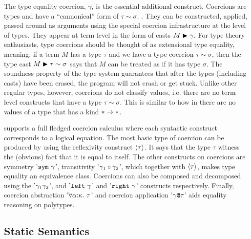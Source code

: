 \documentclass[manuscript,screen,nonacm]{acmart}
\begin{document}
The type equality coercion, $\gamma$, is the essential additional construct. Coercions are types and have a ``cannonical'' form of $\tau\sim\sigma$. . They can be constructed, applied, passed around as arguments using the special coercion infrastructure at the level of types. They appear at term level in the form of casts $M\mathrel{\blacktriangleright}\gamma$. For type theory enthusiasts, type coercions should be thought of as extensional type equality, meaning, if a term $M$ has a type $\tau$ and we have a type coercion $\tau\sim\sigma$, then the type cast $M\mathrel{\blacktriangleright}\tau\sim\sigma$ says that $M$ can be treated as if it has type $\sigma$. The soundness property of the type system guarantees that after the types (including casts) have been erased, the program will not crash or get stuck. Unlike other regular types, however, coercions do not classify values, i.e. there are no term level constructs that have a type $\tau\sim\sigma$. This is similar to how in \SFw there are no values of a type that has a kind $\ast\to\ast$.

\SFC supports a full fledged coercion calculus where each syntactic construct corresponds to a logical equation. The most basic type of coercion can be produced by using the reflexivity construct $\langle\tau\rangle$. It says that the type $\tau$ witness the (obvious) fact that it is equal to itself. The other constructs on coercions are symmetry '$\texttt{sym}~{\gamma}$', transitivity '$\gamma_1 \circ \gamma_2$', which together with $\langle\tau\rangle$, makes type equality an equivalence class. Coercions can also be composed and decomposed using the '$\gamma_1\gamma_2$', and '$\texttt{left}~\gamma$' and '$\texttt{right}~\gamma$' constructs respectively. Finally, coercion abstraction '$\forall\alpha{:}\kappa.~\tau$' and coercion application '$\gamma\texttt{@}\tau$' aids equality reasoning on polytypes.

\subsection{Static Semantics}

\newcommand\TCast{
  \ib{\irule[\trule{cast}]
    {\Typing \TEnv {\Tm} {\tau}}
    {\CoKinding \TEnv \gamma {\tau \sim \sigma}};
    {\Typing \TEnv {\Cast \Tm \gamma} {\sigma}}
  }
}

\newcommand\KReflCo{
  \ib{\irule[\trule{co-refl}]
    {\TyKinding \TEnv \tau \kappa};
    {\CoKinding \TEnv {\refl \tau} {\tau \sim \tau}}
  }
}

\newcommand\KSymCo{
  \ib{\irule[\trule{co-sym}]
    {\CoKinding \TEnv \gamma {\tau \sim \sigma}};
    {\CoKinding \TEnv {\sym \gamma} {\sigma \sim \tau}}
  }
}
\end{document}
